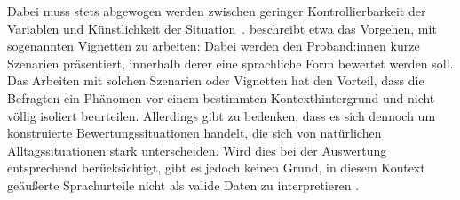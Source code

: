 Dabei muss stets abgewogen werden zwischen geringer Kontrollierbarkeit der Variablen und K{\"u}nstlichkeit der Situation~\citep[s.][4]{Hundt.1992}. 
\citet[1254]{Garrett2005} beschreibt etwa das Vorgehen, mit sogenannten Vignetten zu arbeiten: 
Dabei werden den Proband:innen kurze Szenarien präsentiert, innerhalb derer eine sprachliche Form bewertet werden soll. 
Das Arbeiten mit solchen Szenarien oder Vignetten hat den Vorteil, dass die Befragten ein Phänomen vor einem bestimmten Kontexthintergrund und nicht völlig isoliert beurteilen. 
Allerdings gibt \citet[1254]{Garrett2005} zu bedenken, dass es sich dennoch um konstruierte Bewertungssituationen handelt, die sich von natürlichen Alltagssituationen stark unterscheiden. 
Wird dies bei der Auswertung entsprechend berücksichtigt, gibt es jedoch keinen Grund, in diesem Kontext geäußerte Sprachurteile nicht als valide Daten zu interpretieren \citep[s.][146]{Soukup.2014}.

